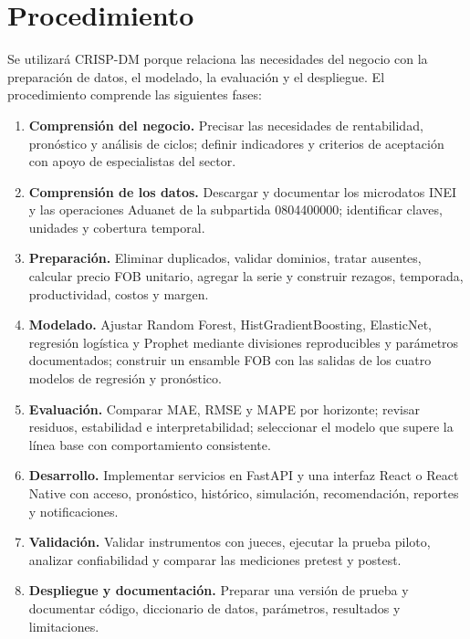\section{Procedimiento}

Se utilizará CRISP-DM porque relaciona las necesidades del negocio con la preparación de datos, el modelado, la evaluación y el despliegue. El procedimiento comprende las siguientes fases:

\begin{enumerate}[label=\textbf{\arabic*.}]
  \item \textbf{Comprensión del negocio.} Precisar las necesidades de rentabilidad, pronóstico y análisis de ciclos; definir indicadores y criterios de aceptación con apoyo de especialistas del sector.
  \item \textbf{Comprensión de los datos.} Descargar y documentar los microdatos INEI y las operaciones Aduanet de la subpartida 0804400000; identificar claves, unidades y cobertura temporal.
  \item \textbf{Preparación.} Eliminar duplicados, validar dominios, tratar ausentes, calcular precio FOB unitario, agregar la serie y construir rezagos, temporada, productividad, costos y margen.
  \item \textbf{Modelado.} Ajustar Random Forest, HistGradientBoosting, ElasticNet, regresión logística y Prophet mediante divisiones reproducibles y parámetros documentados; construir un ensamble FOB con las salidas de los cuatro modelos de regresión y pronóstico.
  \item \textbf{Evaluación.} Comparar MAE, RMSE y MAPE por horizonte; revisar residuos, estabilidad e interpretabilidad; seleccionar el modelo que supere la línea base con comportamiento consistente.
  \item \textbf{Desarrollo.} Implementar servicios en FastAPI y una interfaz React o React Native con acceso, pronóstico, histórico, simulación, recomendación, reportes y notificaciones.
  \item \textbf{Validación.} Validar instrumentos con jueces, ejecutar la prueba piloto, analizar confiabilidad y comparar las mediciones pretest y postest.
  \item \textbf{Despliegue y documentación.} Preparar una versión de prueba y documentar código, diccionario de datos, parámetros, resultados y limitaciones.
\end{enumerate}

